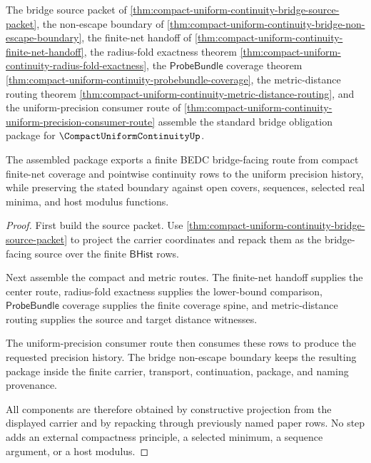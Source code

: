 \begin{theorem}
\label{thm:compact-uniform-continuity-standard-bridge-obligation-package}
The bridge source packet of \autoref{thm:compact-uniform-continuity-bridge-source-packet}, the non-escape boundary of \autoref{thm:compact-uniform-continuity-bridge-non-escape-boundary}, the finite-net handoff of \autoref{thm:compact-uniform-continuity-finite-net-handoff}, the radius-fold exactness theorem \autoref{thm:compact-uniform-continuity-radius-fold-exactness}, the $\mathsf{ProbeBundle}$ coverage theorem \autoref{thm:compact-uniform-continuity-probebundle-coverage}, the metric-distance routing theorem \autoref{thm:compact-uniform-continuity-metric-distance-routing}, and the uniform-precision consumer route of \autoref{thm:compact-uniform-continuity-uniform-precision-consumer-route} assemble the standard bridge obligation package for $\CompactUniformContinuityUp$.

The assembled package exports a finite BEDC bridge-facing route from compact finite-net coverage and pointwise continuity rows to the uniform precision history, while preserving the stated boundary against open covers, sequences, selected real minima, and host modulus functions.
\end{theorem}
\begin{proof}
First build the source packet. Use \autoref{thm:compact-uniform-continuity-bridge-source-packet} to project the carrier coordinates and repack them as the bridge-facing source over the finite $\mathsf{BHist}$ rows.

Next assemble the compact and metric routes. The finite-net handoff supplies the center route, radius-fold exactness supplies the lower-bound comparison, $\mathsf{ProbeBundle}$ coverage supplies the finite coverage spine, and metric-distance routing supplies the source and target distance witnesses.

The uniform-precision consumer route then consumes these rows to produce the requested precision history. The bridge non-escape boundary keeps the resulting package inside the finite carrier, transport, continuation, package, and naming provenance.

All components are therefore obtained by constructive projection from the displayed carrier and by repacking through previously named paper rows. No step adds an external compactness principle, a selected minimum, a sequence argument, or a host modulus.
\end{proof}

